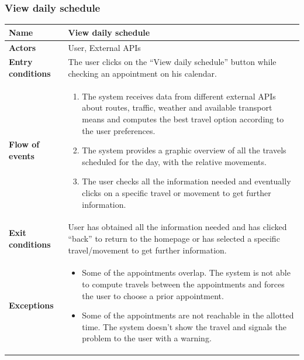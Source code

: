 \subsubsection{View daily schedule}
\begin{table}[!h]
	\centering
	{\renewcommand{\arraystretch}{2}%
		\begin{tabular}{|l|p{12cm}|}
			\hline
			\textbf{Name} 				& \textbf{View daily schedule} \\ \hline
			\textbf{Actors} 			& User, External APIs \\ \hline
			\textbf{Entry conditions} 	& The user clicks on the “View daily schedule” button while checking an appointment on his calendar. \\ \hline
			\textbf{Flow of events}		& \begin{minipage}[t]{0.75\textwidth}
				\begin{enumerate}
					\item The system receives data from different external APIs about routes, traffic, weather and available transport means and computes the best travel option according to the user preferences.
					\item The system provides a graphic overview of all the travels scheduled for the day, with the relative movements.
					\item The user checks all the information needed and eventually clicks on a specific travel or movement to get further information.
				\end{enumerate}
			\end{minipage}	\\ \hline
			\textbf{Exit conditions}	& User has obtained all the information needed and has clicked “back” to return to the homepage or has selected a specific travel/movement to get further information.  \\ \hline
			\textbf{Exceptions}			& \begin{minipage}[t]{0.75\textwidth}
				\begin{itemize}
					\item Some of the appointments overlap. The system is not able to compute travels between the appointments and forces the user to choose a prior appointment.
					\item Some of the appointments are not reachable in the allotted time. The system doesn’t show the travel and signals the problem to the user with a warning.
				\end{itemize} 
			\end{minipage} \\ \hline
	\end{tabular}}
\end{table}
\clearpage

